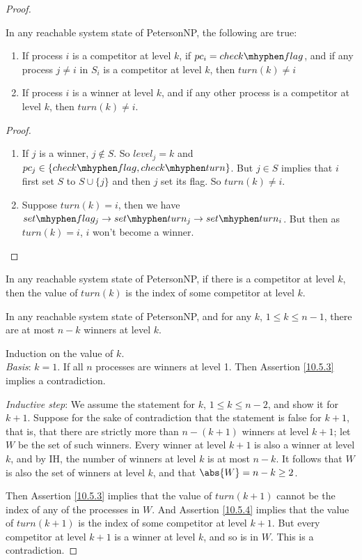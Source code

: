 \documentclass[11pt]{article}
\def \setflag {set\mhyphen flag}
\def \checkflag {check\mhyphen flag}
\def \checkturn {check\mhyphen turn}
\def \setturn {set\mhyphen turn}
\begin{document}
\begin{proof}
\begin{assertion}
\label{10.5.3}
In any reachable system state of PetersonNP, the following are true:
\begin{enumerate}
\item If process \(i\) is a competitor at level \(k\), if \(pc_i=\checkflag\), and if any process
\(j\neq i\) in \(S_i\) is a competitor at level \(k\), then \(turn(k)\neq i\)
\item If process \(i\) is a winner at level \(k\), and if any other process is a competitor at level
\(k\), then \(turn(k)\neq i\).
\end{enumerate}
\end{assertion}

\begin{proof}
\begin{enumerate}
\item If \(j\) is a winner, \(j\notin S\). So \(level_j=k\) and \(pc_j\in\{\checkflag,\checkturn\}\). But \(j\in S\) implies
that \(i\) first set \(S\) to \(S\cup\{j\}\) and then \(j\) set its flag. So \(turn(k)\neq i\).
\item Suppose \(turn(k)=i\), then we have \(\setflag_j\to\setturn_j\to\setturn_i\). But then as \(turn(k)=i\), \(i\) won't become a winner.
\end{enumerate}
\end{proof}
\begin{assertion}
\label{10.5.4}
In any reachable system state of PetersonNP, if there is a competitor at level \(k\), then the value
of \(turn(k)\) is the index of some competitor at level \(k\).
\end{assertion}

\begin{assertion}
\label{10.5.5}
In any reachable system state of PetersonNP, and for any \(k\), \(1\le k\le n-1\), there are at most
\(n-k\) winners at level \(k\).
\end{assertion}

Induction on the value of \(k\).\\
\emph{Basis}: \(k=1\). If all \(n\) processes are winners at level 1. Then Assertion \ref{10.5.3} implies a
contradiction.

\emph{Inductive step}: We assume the statement for \(k\), \(1\le k\le n-2\), and show it for \(k+1\). Suppose
for the sake of contradiction that the statement is false for \(k+1\), that is, that there are
strictly more than \(n-(k+1)\) winners at level \(k+1\); let \(W\) be the set of such winners. Every
winner at level \(k+1\) is also a winner at level \(k\), and by IH, the number of winners at level
\(k\) is at most \(n-k\). It follows that \(W\) is also the set of winners at level \(k\), and that
\(\abs{W}=n-k\ge 2\).

Then Assertion \ref{10.5.3} implies that the value of \(turn(k+1)\) cannot be the index of any of the
processes in \(W\). And Assertion \ref{10.5.4} implies that the value of \(turn(k+1)\) is the index of
some competitor at level \(k+1\). But every competitor at level \(k+1\) is a winner at level \(k\),
and so is in \(W\). This is a contradiction.
\end{proof}
\end{document}
